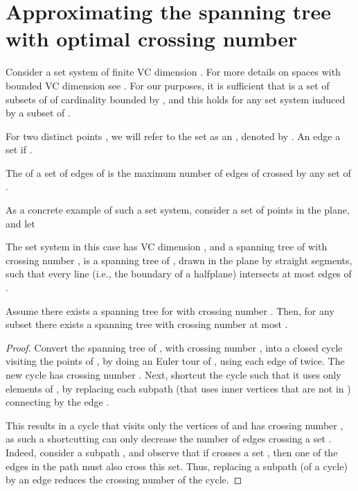 \documentclass[12pt]{article}
\newcommand{\Term}[1]{\textsf{#1}}
\newcommand{\VC}{\Term{V{C}}\xspace}
\begin{document}
\section{Approximating the spanning tree with optimal crossing number}

Consider a set system  of finite \VC
dimension . For more details on spaces with bounded \VC
dimension see \cite{pa-cg-95}. For our purposes, it is sufficient that
 is a set of subsets of  of cardinality bounded by
, and this holds for any set system induced by
a subset of .

For two distinct points , we will refer to
the set  as an , denoted by .  An edge   a set  if
.

The  of a set of edges  of  is the
maximum number of edges of  crossed by any set of .

\begin{example}
    As a concrete example of such a set system, consider a set 
    of  points in the plane, and let 
    
    The set system  in this case has \VC
    dimension , and a spanning tree  of  with crossing
    number , is a spanning tree of , drawn in the plane by
    straight segments, such that every line (i.e., the boundary of a
    halfplane) intersects at most  edges of .
\end{example}

\begin{lemma}
    Assume there exists a spanning tree  for  with
    crossing number . Then, for any subset 
    there exists a spanning tree with crossing number at most .

\end{lemma}

\begin{proof}
    Convert the spanning tree  of , with crossing number
    , into a closed cycle  visiting the points of , by
    doing an Euler tour of , using each edge of  twice. The new
    cycle  has crossing number .  Next, shortcut the cycle 
    such that it uses only elements of , by replacing each subpath
     (that uses inner vertices that are not in )
    connecting  by the edge .

    This results in a cycle that visits only the vertices of  and
    has crossing number , as such a shortcutting can only
    decrease the number of edges crossing a set . Indeed, consider a subpath , and observe that if  crosses a set , then
    one of the edges in the path must also cross this set. Thus,
    replacing a subpath (of a cycle) by an edge reduces the crossing
    number of the cycle.
\end{proof}
\end{document}
